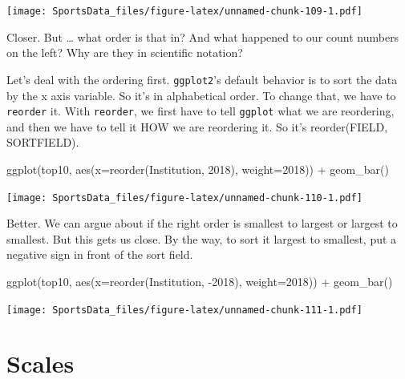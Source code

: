 \documentclass[
]{book}
\newenvironment{Shaded}{\begin{snugshade}}{\end{snugshade}}
\newcommand{\AttributeTok}[1]{\textcolor[rgb]{0.77,0.63,0.00}{#1}}
\newcommand{\FunctionTok}[1]{\textcolor[rgb]{0.00,0.00,0.00}{#1}}
\newcommand{\NormalTok}[1]{#1}
\newcommand{\SpecialCharTok}[1]{\textcolor[rgb]{0.00,0.00,0.00}{#1}}
\newcommand{\StringTok}[1]{\textcolor[rgb]{0.31,0.60,0.02}{#1}}
\begin{document}
\texttt{[image: SportsData\_files/figure-latex/unnamed-chunk-109-1.pdf]}

Closer. But \ldots{} what order is that in? And what happened to our count numbers on the left? Why are they in scientific notation?

Let's deal with the ordering first. \texttt{ggplot2}'s default behavior is to sort the data by the x axis variable. So it's in alphabetical order. To change that, we have to \texttt{reorder} it. With \texttt{reorder}, we first have to tell \texttt{ggplot} what we are reordering, and then we have to tell it HOW we are reordering it. So it's reorder(FIELD, SORTFIELD).

\begin{Shaded}
\begin{Highlighting}[]
\FunctionTok{ggplot}\NormalTok{(top10, }\FunctionTok{aes}\NormalTok{(}\AttributeTok{x=}\FunctionTok{reorder}\NormalTok{(Institution, }\StringTok{\textasciigrave{}}\AttributeTok{2018}\StringTok{\textasciigrave{}}\NormalTok{), }\AttributeTok{weight=}\StringTok{\textasciigrave{}}\AttributeTok{2018}\StringTok{\textasciigrave{}}\NormalTok{)) }\SpecialCharTok{+} \FunctionTok{geom\_bar}\NormalTok{()}
\end{Highlighting}
\end{Shaded}

\texttt{[image: SportsData\_files/figure-latex/unnamed-chunk-110-1.pdf]}

Better. We can argue about if the right order is smallest to largest or largest to smallest. But this gets us close. By the way, to sort it largest to smallest, put a negative sign in front of the sort field.

\begin{Shaded}
\begin{Highlighting}[]
\FunctionTok{ggplot}\NormalTok{(top10, }\FunctionTok{aes}\NormalTok{(}\AttributeTok{x=}\FunctionTok{reorder}\NormalTok{(Institution, }\SpecialCharTok{{-}}\StringTok{\textasciigrave{}}\AttributeTok{2018}\StringTok{\textasciigrave{}}\NormalTok{), }\AttributeTok{weight=}\StringTok{\textasciigrave{}}\AttributeTok{2018}\StringTok{\textasciigrave{}}\NormalTok{)) }\SpecialCharTok{+} \FunctionTok{geom\_bar}\NormalTok{()}
\end{Highlighting}
\end{Shaded}

\texttt{[image: SportsData\_files/figure-latex/unnamed-chunk-111-1.pdf]}

\hypertarget{scales}{%
\section{Scales}\label{scales}}
\end{document}
